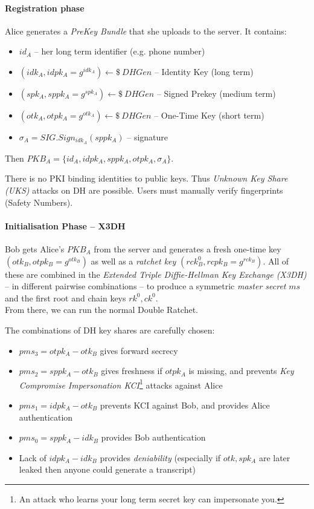 \paragraph{Registration phase}
Alice generates a \emph{PreKey Bundle} that she uploads to the server.
It contains:
\begin{itemize}
\item $id_A$ -- her long term identifier (e.g. phone number)
\item $(idk_A, idpk_A = g^{idk_A}) \leftarrow \$\ DHGen$ -- Identity Key (long term)
\item $(spk_A, sppk_A = g^{spk_A}) \leftarrow \$\ DHGen$ -- Signed Prekey (medium term)
\item $(otk_A, otpk_A = g^{otk_A}) \leftarrow \$\ DHGen$ -- One-Time Key (short term)
\item $\sigma_A = SIG.Sign_{idk_A}(sppk_A)$ -- signature
\end{itemize}
Then $PKB_A = \{ id_A, idpk_A, sppk_A, otpk_A, \sigma_A \} $.

There is no PKI binding identities to public keys.
Thus \emph{Unknown Key Share (UKS)} attacks on DH are possible.
Users must manually verify fingerprints (Safety Numbers).

\paragraph{Initialisation Phase -- X3DH}
Bob gets Alice's $PKB_A$ from the server and generates a fresh one-time key
$(otk_B, otpk_B = g^{otk_B})$ as well as a \emph{ratchet key}
$(rck_B^0, rcpk_B = g^{rck_B})$.
All of these are combined in the \emph{Extended Triple Diffie-Hellman Key Exchange (X3DH)}
-- in different pairwise combinations -- to produce a symmetric \emph{master secret} $ms$ and the first root and chain keys $rk^0, ck^0$.
\\
From there, we can run the normal Double Ratchet.

The combinations of DH key shares are carefully chosen:
\begin{itemize}
\item $pms_3 = otpk_A-otk_B$ gives forward secrecy
\item $pms_2 = sppk_A-otk_B$ gives freshness if $otpk_A$ is missing, and prevents
\emph{Key Compromise Impersonation KCI}\footnote{An attack who learns your long term secret key can impersonate you.}
attacks against Alice
\item $pms_1 = idpk_A-otk_B$ prevents KCI against Bob, and provides Alice authentication
\item $pms_0 = sppk_A-idk_B$ provides Bob authentication
\item Lack of $idpk_A-idk_B$ provides \emph{deniability}
(especially if $otk, spk_A$ are later leaked then anyone could generate a transcript)
\end{itemize}

